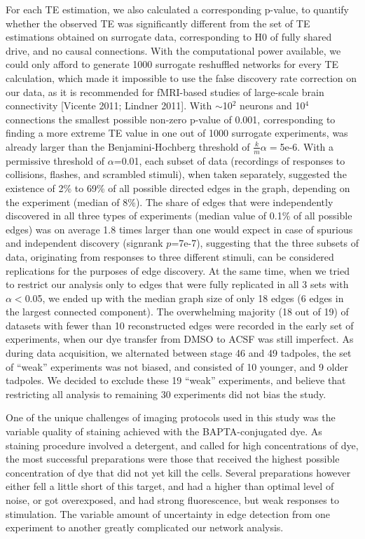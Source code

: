 \documentclass{article}
\begin{document}
For each TE estimation, we also calculated a corresponding p-value, to quantify whether the observed TE was significantly different from the set of TE estimations obtained on surrogate data, corresponding to H0 of fully shared drive, and no causal connections. With the computational power available, we could only afford to generate 1000 surrogate reshuffled networks for every TE calculation, which made it impossible to use the false discovery rate correction on our data, as it is recommended for fMRI-based studies of large-scale brain connectivity [Vicente 2011; Lindner 2011]. With $\sim$10$^2$ neurons and 10$^4$ connections the smallest possible non-zero p-value of 0.001, corresponding to finding a more extreme TE value in one out of 1000 surrogate experiments, was already larger than the Benjamini-Hochberg threshold of $\frac{k}{m}\alpha=$5e-6. With a permissive threshold of $\alpha$=0.01, each subset of data (recordings of responses to collisions, flashes, and scrambled stimuli), when taken separately, suggested the existence of 2\% to 69\% of all possible directed edges in the graph, depending on the experiment (median of 8\%). The share of edges that were independently discovered in all three types of experiments (median value of 0.1\% of all possible edges) was on average 1.8 times larger than one would expect in case of spurious and independent discovery (signrank $p$=7e-7), suggesting that the three subsets of data, originating from responses to three different stimuli, can be considered replications for the purposes of edge discovery. At the same time, when we tried to restrict our analysis only to edges that were fully replicated in all 3 sets with $\alpha < $0.05, we ended up with the median graph size of only 18 edges (6 edges in the largest connected component). The overwhelming majority (18 out of 19) of datasets with fewer than 10 reconstructed edges were recorded in the early set of experiments, when our dye transfer from DMSO to ACSF was still imperfect. As during data acquisition, we alternated between stage 46 and 49 tadpoles, the set of “weak” experiments was not biased, and consisted of 10 younger, and 9 older tadpoles. We decided to exclude these 19 “weak” experiments, and believe that restricting all analysis to remaining 30 experiments did not bias the study.

One of the unique challenges of imaging protocols used in this study was the variable quality of staining achieved with the BAPTA-conjugated dye. As staining procedure involved a detergent, and called for high concentrations of dye, the most successful preparations were those that received the highest possible concentration of dye that did not yet kill the cells. Several preparations however either fell a little short of this target, and had a higher than optimal level of noise, or got overexposed, and had strong fluorescence, but weak responses to stimulation. The variable amount of uncertainty in edge detection from one experiment to another greatly complicated our network analysis.
\end{document}
